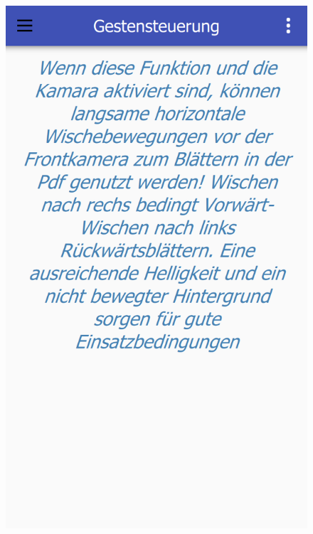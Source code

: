\begin{figure}[ht!]
\begin{minipage}{0.31\linewidth}
		\includegraphics[scale=0.5]{GUI/Bilder/Gestensteuerung.PNG}
	\end{minipage}
	\begin{minipage}{0.31\linewidth}
		\centering

\end{minipage}
\end{figure}
